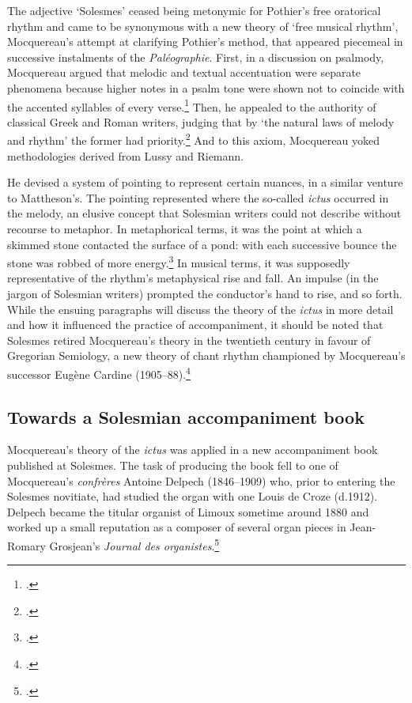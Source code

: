 The adjective `Solesmes' ceased being metonymic for Pothier's free oratorical rhythm and came to be synonymous with a new theory of `free musical rhythm', Mocquereau's attempt at clarifying Pothier's method, that appeared piecemeal in successive instalments of the \emph{Paléographie}.
First, in a discussion on psalmody, Mocquereau argued that melodic and textual accentuation were separate phenomena because higher notes in a psalm tone were shown not to coincide with the accented syllables of every verse.\footcites[12]{MocquereauPaleographiemusicale1892}[For a discussion of how textual and musical accents are separate, see][20]{MocquereauPaleographiemusicale1896}
Then, he appealed to the authority of classical Greek and Roman writers, judging that by `the natural laws of melody and rhythm' the former had priority.\footcite[68]{MocquereauPaleographiemusicale1894}
And to this axiom, Mocquereau yoked methodologies derived from Lussy and Riemann.

\label{sc:solesmes_ictus}%
He devised a system of pointing to represent certain nuances, in a similar venture to Mattheson's.
The pointing represented where the so-called \emph{ictus} occurred in the melody, an elusive concept that Solesmian writers could not describe without recourse to metaphor.
In metaphorical terms, it was the point at which a skimmed stone contacted the surface of a pond: with each successive bounce the stone was robbed of more energy.\footcite[A metaphor of a golfer is provided in][303]{MocquereauPaleographiemusicale1901}
In musical terms, it was supposedly representative of the rhythm's metaphysical rise and fall.
An impulse (in the jargon of Solesmian writers) prompted the conductor's hand to rise, and so forth.
While the ensuing paragraphs will discuss the theory of the \emph{ictus} in more detail and how it influenced the practice of accompaniment, it should be noted that Solesmes retired Mocquereau's theory in the twentieth century in favour of Gregorian Semiology, a new theory of chant rhythm championed by Mocquereau's successor Eugène Cardine (1905--88).\footcite[77]{Viretchantgregorientradition2001}

\subsection{Towards a Solesmian accompaniment book}
Mocquereau's theory of the \emph{ictus} was applied in a new accompaniment book published at Solesmes.
The task of producing the book fell to one of Mocquereau's \emph{confrères} Antoine Delpech (1846--1909) who, prior to entering the Solesmes novitiate, had studied the organ with one Louis de Croze (d.1912).
Delpech became the titular organist of Limoux sometime around 1880 and worked up a small reputation as a composer of several organ pieces in Jean-Romary Grosjean's \emph{Journal des organistes}.\footcites[47]{SeveracDeodatSeveracmusique2002}[Also referenced in][451]{HalaSolesmesmusiciensSchola2017}

